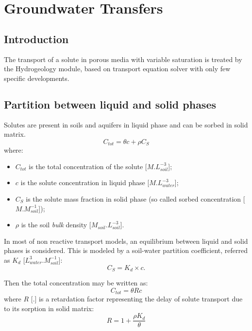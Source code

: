 \section{Groundwater Transfers}

\subsection{Introduction}
The transport of a solute in porous media with variable saturation is treated by
the Hydrogeology module, based on \CS transport equation solver with only few
specific developments.

\subsection{Partition between liquid and solid phases}
Solutes are present in soils and aquifers in liquid phase and can be sorbed
in solid matrix.
\begin{equation}
\label{eq:groundwater:partition_liquid_solid}
  C_{tot} = \theta c + \rho C_S
\end{equation}
where:
\begin{itemize}
  \item $C_{tot}$ is the total concentration of the solute [$M.L^{-3}_{soil}$];
  \item $c$ is the solute concentration in liquid phase [$M.L^{-3}_{water}$];
  \item $C_S$ is the solute mass fraction in solid phase (so called sorbed
        concentration [$M.M^{-1}_{soil}$]);
  \item $\rho$ is the soil \textit{bulk} density [$M_{soil}.L^{-3}_{soil}$].
\end{itemize}

In most of non reactive transport models, an equilibrium between liquid and
solid phases is considered. This is modeled by a soil-water partition
coefficient, referred as $K_d$ [$L^3_{water}.M^{-1}_{soil}$]:
\begin{equation}
  \label{eq:groundwater:Kd}
  C_S = K_d \times c.
\end{equation}

Then the total concentration may be written as:
\begin{equation}
  C_{tot} = \theta R c
\end{equation}
where $R$ [.] is a retardation factor representing the delay of solute transport
due to its sorption in solid matrix:
\begin{equation}
  R = 1 + \frac{\rho K_d}{\theta}
\end{equation}


